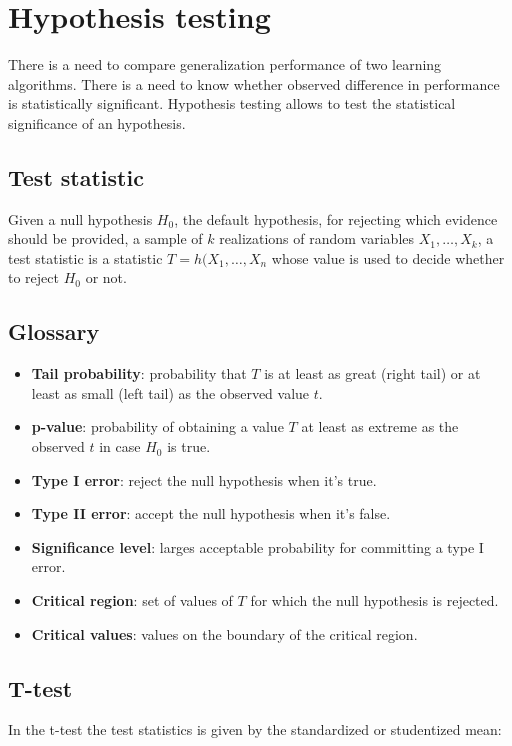 \section{Hypothesis testing}
There is a need to compare generalization performance of two learning algorithms.
There is a need to know whether observed difference in performance is statistically significant.
Hypothesis testing allows to test the statistical significance of an hypothesis.

	\subsection{Test statistic}
	Given a null hypothesis $H_0$, the default hypothesis, for rejecting which evidence should be provided, a sample of $k$ realizations of random variables $X_1, \dots, X_k$, a test statistic is a statistic $T = h(X_1, \dots, X_n$ whose value is used to decide whether to reject $H_0$ or not.

	\subsection{Glossary}

	\begin{multicols}{2}
		\begin{itemize}
			\item \textbf{Tail probability}: probability that $T$ is at least as great (right tail) or at least as small (left tail) as the observed value $t$.
			\item \textbf{p-value}: probability of obtaining a value $T$ at least as extreme as the observed $t$ in case $H_0$ is true.
			\item \textbf{Type I error}: reject the null hypothesis when it's true.
			\item \textbf{Type II error}: accept the null hypothesis when it's false.
			\item \textbf{Significance level}: larges acceptable probability for committing a type I error.
			\item \textbf{Critical region}: set of values of $T$ for which the null hypothesis is rejected.
			\item \textbf{Critical values}: values on the boundary of the critical region.
				\end{itemize}
	\end{multicols}

	\subsection{T-test}
	In the t-test the test statistics is given by the standardized or studentized mean:

